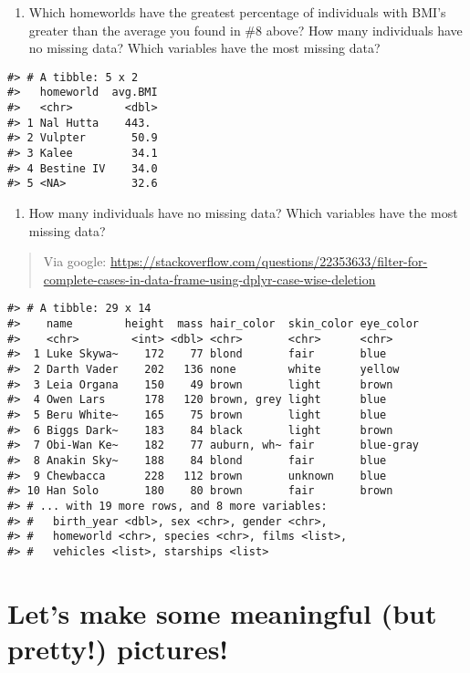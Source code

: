\documentclass[
]{book}
\providecommand{\tightlist}{%
  \setlength{\itemsep}{0pt}\setlength{\parskip}{0pt}}
\begin{document}
\begin{enumerate}
\def\labelenumi{\arabic{enumi}.}
\setcounter{enumi}{8}
\tightlist
\item
  Which homeworlds have the greatest percentage of individuals with BMI's greater than the average you found in \#8 above?
  How many individuals have no missing data? Which variables have the most missing data?
\end{enumerate}

\begin{verbatim}
#> # A tibble: 5 x 2
#>   homeworld  avg.BMI
#>   <chr>        <dbl>
#> 1 Nal Hutta    443. 
#> 2 Vulpter       50.9
#> 3 Kalee         34.1
#> 4 Bestine IV    34.0
#> 5 <NA>          32.6
\end{verbatim}

\begin{enumerate}
\def\labelenumi{\arabic{enumi}.}
\setcounter{enumi}{9}
\tightlist
\item
  How many individuals have no missing data? Which variables have the most missing data?
\end{enumerate}

\begin{quote}
Via google: \url{https://stackoverflow.com/questions/22353633/filter-for-complete-cases-in-data-frame-using-dplyr-case-wise-deletion}
\end{quote}

\begin{verbatim}
#> # A tibble: 29 x 14
#>    name        height  mass hair_color  skin_color eye_color
#>    <chr>        <int> <dbl> <chr>       <chr>      <chr>    
#>  1 Luke Skywa~    172    77 blond       fair       blue     
#>  2 Darth Vader    202   136 none        white      yellow   
#>  3 Leia Organa    150    49 brown       light      brown    
#>  4 Owen Lars      178   120 brown, grey light      blue     
#>  5 Beru White~    165    75 brown       light      blue     
#>  6 Biggs Dark~    183    84 black       light      brown    
#>  7 Obi-Wan Ke~    182    77 auburn, wh~ fair       blue-gray
#>  8 Anakin Sky~    188    84 blond       fair       blue     
#>  9 Chewbacca      228   112 brown       unknown    blue     
#> 10 Han Solo       180    80 brown       fair       brown    
#> # ... with 19 more rows, and 8 more variables:
#> #   birth_year <dbl>, sex <chr>, gender <chr>,
#> #   homeworld <chr>, species <chr>, films <list>,
#> #   vehicles <list>, starships <list>
\end{verbatim}

\hypertarget{lets-make-some-meaningful-but-pretty-pictures}{%
\chapter{Let's make some meaningful (but pretty!) pictures!}\label{lets-make-some-meaningful-but-pretty-pictures}}
\end{document}

